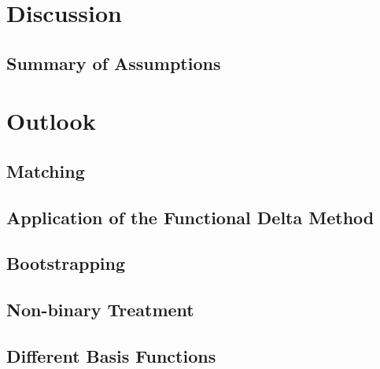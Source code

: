 \section{Discussion}
\subsection{Summary of Assumptions}
  
\section{Outlook}
\subsection{Matching}
  
\subsection{Application of the Functional Delta Method}
  
\subsection{Bootstrapping} 
  
\subsection{Non-binary Treatment}
  
\subsection{Different Basis Functions}
  
